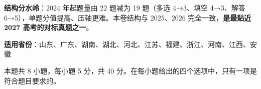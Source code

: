 

\begin{gknotice}
\textbf{结构分水岭}：2024 年起题量由 22 题减为 19 题（多选 4→3、填空 4→3、解答 6→5），单题分值提高、压轴更难。本卷结构与 2025、2026 完全一致，\textbf{是最贴近 2027 高考的对标真题之一}。

\textbf{适用省份}：山东、广东、湖南、湖北、河北、江苏、福建、浙江、河南、江西、安徽
\end{gknotice}

\par\medskip


\begin{gktip}
本题共 8 小题，每小题 5 分，共 40 分。在每小题给出的四个选项中，只有一项是符合题目要求的。
\end{gktip}

